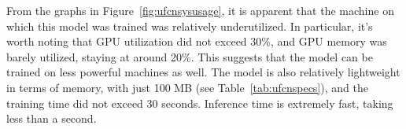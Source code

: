 From the graphs in Figure~\ref{fig:ufcnsysusage}, it is apparent that the
machine on which this model was trained was relatively underutilized.
In particular, it's worth noting that GPU utilization did not exceed 30\%,
and GPU memory was barely utilized, staying at around 20\%.
This suggests that the model can be trained on less powerful machines as well.
The model is also relatively lightweight in terms of memory,
with just 100 MB (see Table~\ref{tab:ufcnspecs}), and the training time
did not exceed 30 seconds.
Inference time is extremely fast, taking less than a second.


